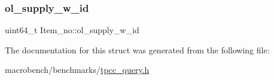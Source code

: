 \mbox{\label{structItem__no_a5591ec2280225b1bf0397ebdf37510cc}} 
\subsubsection{\texorpdfstring{ol\+\_\+supply\+\_\+w\+\_\+id}{ol\_supply\_w\_id}}
{\footnotesize\ttfamily uint64\+\_\+t Item\+\_\+no\+::ol\+\_\+supply\+\_\+w\+\_\+id}



The documentation for this struct was generated from the following file\+:\begin{DoxyCompactItemize}
\item 
macrobench/benchmarks/\hyperlink{tpcc__query_8h}{tpcc\+\_\+query.\+h}\end{DoxyCompactItemize}
